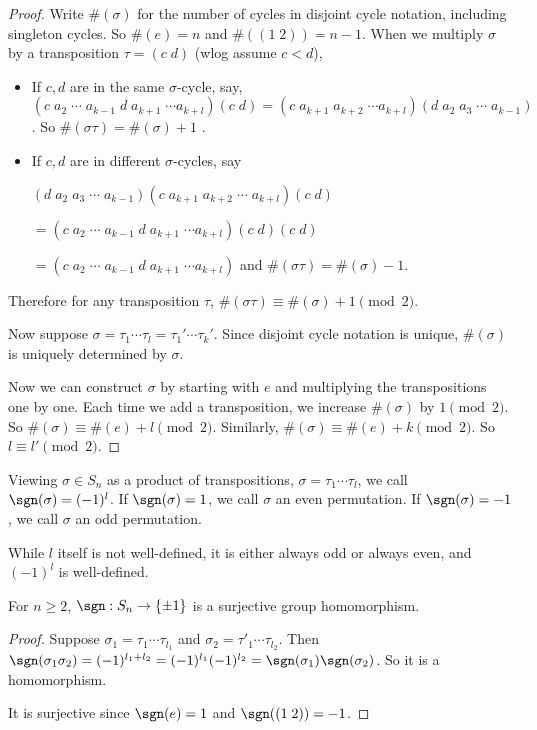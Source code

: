 \documentclass[a4pape]{article}
\begin{document}
\begin{proof}
  Write $\#(\sigma)$ for the number of cycles in disjoint cycle notation, including singleton cycles. So $\#(e) = n$ and $\#((1\; 2)) = n - 1$. When we multiply $\sigma$ by a transposition $\tau = (c\; d)$ (wlog assume $c < d$),
  \begin{itemize}
  \item If $c, d$ are in the same $\sigma$-cycle, say, $(c\; a_2\; \cdots \; a_{k - 1}\; d\; a_{k + 1}\; \cdots a_{k + l})(c\; d) = (c\; a_{k+1}\; a_{k+2}\;\cdots a_{k + l})(d\; a_2\; a_3\;\cdots\; a_{k - 1})$. So $\#(\sigma\tau) = \#(\sigma) + 1$ .
  \item If $c, d$ are in different $\sigma$-cycles, say

$(d\; a_2\; a_3\;\cdots\;a_{k - 1})(c\; a_{k + 1}\; a_{k + 2}\;\cdots\; a_{k + l})(c\; d) $

$=(c\; a_2\; \cdots \; a_{k - 1}\; d\; a_{k + 1}\; \cdots a_{k + l})(c\; d)(c\; d)$

$= (c\; a_2\; \cdots \; a_{k - 1}\; d\; a_{k + 1}\; \cdots a_{k + l})$ and $\#(\sigma\tau) = \#(\sigma) - 1$.

  \end{itemize}
  Therefore for any transposition $\tau$, $\#(\sigma\tau) \equiv \#(\sigma) + 1 \pmod 2$. 

  Now suppose $\sigma = \tau_1\cdots\tau_l = \tau_1'\cdots\tau_{k}'$. Since disjoint cycle notation is unique, $\#(\sigma)$ is uniquely determined by $\sigma$. 

  Now we can construct $\sigma$ by starting with $e$ and multiplying the transpositions one by one. Each time we add a transposition, we increase $\#(\sigma)$ by $1 \pmod 2$. So $\#(\sigma) \equiv \#(e) + l\pmod 2$. Similarly, $\#(\sigma) \equiv \#(e) + k \pmod 2$. So $l \equiv l' \pmod 2$.
\end{proof}

\begin{defi}
  Viewing $\sigma\in S_n$ as a product of transpositions, $\sigma = \tau_1\cdots \tau_l$, we call $\sgn(\sigma) = (-1)^l$. If $\sgn(\sigma) = 1$, we call $\sigma$ an even permutation. If $\sgn(\sigma) = -1$, we call $\sigma$ an odd permutation.
\end{defi}
\note While $l$ itself is not well-defined, it is either always odd or always even, and $(-1)^l$ is well-defined.

\begin{thm}
  For $n\geq 2$, $\sgn : S_n \rightarrow \{\pm 1\}$ is a surjective group homomorphism. 
\end{thm}
\begin{proof}
  Suppose $\sigma_1 = \tau_1\cdots \tau_{l_1}$ and $\sigma_2 = \tau'_1\cdots \tau_{l_2}$. Then $\sgn(\sigma_1\sigma_2) = (-1)^{l_1 + l_2} = (-1)^{l_1}(-1)^{l_2} = \sgn(\sigma_1)\sgn(\sigma_2)$. So it is a homomorphism.

It is surjective since $\sgn(e) = 1$ and $\sgn((1\; 2)) = -1$.
\end{proof}
\end{document}
